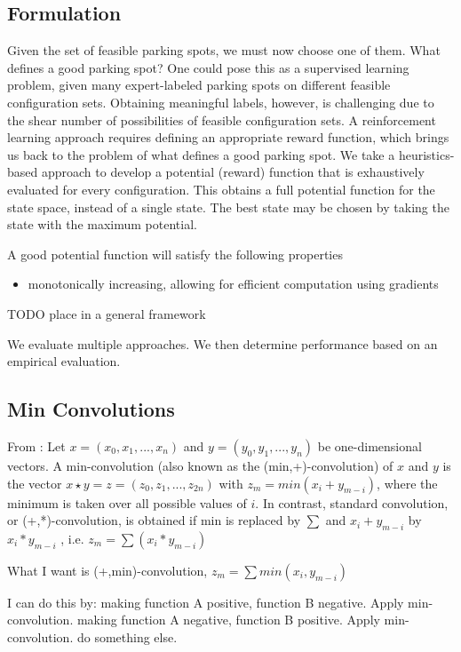 \subsection{Formulation}
Given the set of feasible parking spots, we must now choose one of them. What
defines a good parking spot? One could pose this as a supervised learning
problem, given many expert-labeled parking spots on different feasible
configuration sets.  Obtaining meaningful labels, however, is challenging due to
the shear number of possibilities of feasible configuration sets. A
reinforcement learning approach requires defining an appropriate reward
function, which brings us back to the problem of what defines a good parking
spot. We take a heuristics-based approach to develop a potential (reward)
function that is exhaustively evaluated for every configuration.
This obtains a full potential function for the state space, instead of a single
state. The best state may be chosen by taking the state with the maximum
potential.

A good potential function will satisfy the following properties
\begin{itemize}
\item monotonically increasing, allowing for efficient computation
using gradients
\end{itemize}

TODO place in a general framework

We evaluate multiple approaches. We then determine performance based on an
empirical evaluation.

\subsection{Min Convolutions}
From \cite{burcsi2010table}:
Let $x = (x_0, x_1, ..., x_n)$ and $y = (y_0, y_1, ..., y_n)$ be one-dimensional
vectors.
A min-convolution (also known as the (min,+)-convolution) of $x$ and $y$ is the
vector $x \star y = z = (z_0, z_1, ...,z_{2n})$
with $z_m = min(x_i + y_{m-i})$, where the minimum is taken over all possible
values of $i$. 
In contrast, standard convolution, or (+,*)-convolution, is obtained if min is replaced by $\sum$ and
$x_i + y_{m-i}$ by $x_i * y_{m-i}$ , i.e. 
$z_m = \sum(x_i * y_{m-i})$

What I want is (+,min)-convolution, $z_m = \sum min(x_i , y_{m-i})$

I can do this by:
making function A positive, function B negative.
Apply min-convolution.
making function A negative, function B positive.
Apply min-convolution.
do something else.


